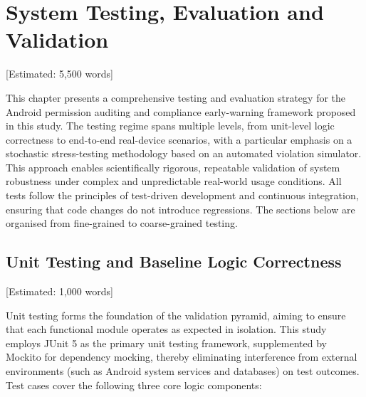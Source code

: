 \newpage\section{System Testing, Evaluation and Validation} [Estimated: 5,500 words]

This chapter presents a comprehensive testing and evaluation strategy for the Android permission auditing and compliance early-warning framework proposed in this study. The testing regime spans multiple levels, from unit-level logic correctness to end-to-end real-device scenarios, with a particular emphasis on a stochastic stress-testing methodology based on an automated violation simulator. This approach enables scientifically rigorous, repeatable validation of system robustness under complex and unpredictable real-world usage conditions. All tests follow the principles of test-driven development and continuous integration, ensuring that code changes do not introduce regressions. The sections below are organised from fine-grained to coarse-grained testing.

\subsection{Unit Testing and Baseline Logic Correctness} [Estimated: 1,000 words]

Unit testing forms the foundation of the validation pyramid, aiming to ensure that each functional module operates as expected in isolation. This study employs JUnit 5 as the primary unit testing framework, supplemented by Mockito for dependency mocking, thereby eliminating interference from external environments (such as Android system services and databases) on test outcomes. Test cases cover the following three core logic components:

